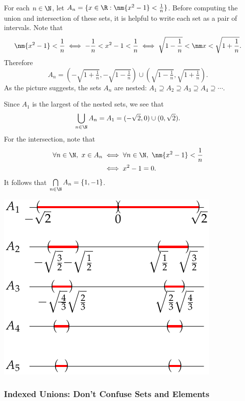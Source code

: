 \begin{examples}
	\item For each $n\in\N$, let $A_n=\{x\in\R:\nm{x^2-1}<\frac 1n\}$. Before computing the union and intersection of these sets, it is helpful to write each set as a pair of intervals. Note that
	\[\nm{x^2-1}<\frac 1n\iff -\frac 1n< x^2-1<\frac 1n\iff \sqrt{1-\frac 1n}< \nm x< \sqrt{1+\frac 1n}.\]
	Therefore
	\[A_n=\left(-\sqrt{1+\tfrac 1n},-\sqrt{1-\tfrac 1n}\right)\cup\left(\sqrt{1-\tfrac 1n},\sqrt{1+\tfrac 1n}\right).\]
	As the picture suggests, the sets $A_n$ are nested: $A_1\supseteq A_2\supseteq A_3\supseteq A_4\supseteq\cdots$.\\[5pt]
	\noindent\begin{minipage}{0.5\textwidth}
	Since $A_1$ is the largest of the nested sets, we see that
	\[\bigcup\limits_{n\in\N}A_n=A_1=(-\sqrt{2},0)\cup(0,\sqrt{2}).\]
	For the intersection, note that
	\begin{align*}
	\forall n\in\N,\ x\in A_n&\iff \forall n\in\N,\ \nm{x^2-1}<\frac 1n\\
	&\iff x^2-1=0.
	\end{align*}
	It follows that $\bigcap\limits_{n\in\N}A_n=\{1,-1\}$.
	\end{minipage}\hfill\begin{minipage}{0.38\textwidth}
	\includegraphics[width=\textwidth]{setsii-05-intervalex}
	\end{minipage}
\end{examples}


\subsubsection*{Indexed Unions: Don't Confuse Sets and Elements}

